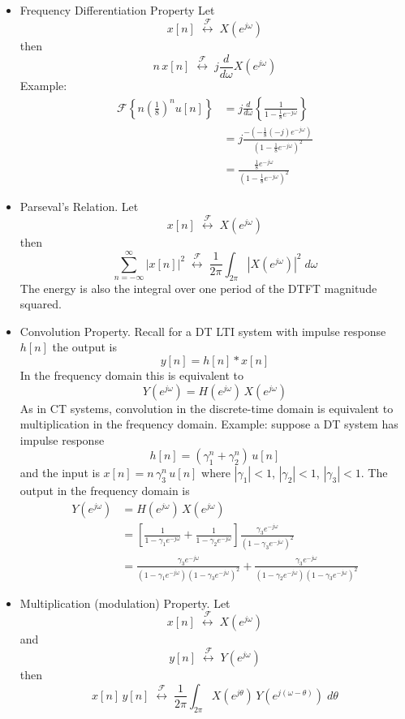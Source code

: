 \begin{itemize}
\begin{center}
\end{center}
\item Frequency Differentiation Property
  Let
  \[
  x[n] \; \stackrel{\mathcal{F}}{\longleftrightarrow} \; X\left(e^{j\omega}\right)
  \]
  then
  \[
  n\, x[n] \; \stackrel{\mathcal{F}}{\longleftrightarrow} \; j \frac{d}{d\omega} X\left(e^{j\omega}\right)
  \]
  Example:
  \begin{align*}
    \mathcal{F}\left\{ n\left( \frac{1}{8}\right)^n u[n] \right\} &= j \frac{d}{d\omega} \left\{\frac{1}{1-\frac{1}{8}e^{-j\omega}} \right\}\\
    &= j \frac{-\left(-\frac{1}{8} (-j)e^{-j\omega}\right)}{\left( 1-\frac{1}{8}e^{-j\omega} \right)^2}\\
    &= \frac{\frac{1}{8}e^{-j\omega}}{\left( 1-\frac{1}{8}e^{-j\omega} \right)^2}
  \end{align*}
\item Parseval's Relation.
  Let
  \[
  x[n] \; \stackrel{\mathcal{F}}{\longleftrightarrow} \; X\left(e^{j\omega}\right)
  \]
  then
  \[
  \sum\limits_{n = -\infty}^{\infty} |x[n]|^2 \; \stackrel{\mathcal{F}}{\longleftrightarrow} \;
  \frac{1}{2\pi} \int_{2\pi} \left| X\left(e^{j\omega}\right) \right|^2 \; d\omega
  \]
  The energy is also the integral over one period of the DTFT magnitude squared. 
\item Convolution Property.
  Recall for a DT LTI system with impulse response $h[n]$ the output is
  \[
  y[n] = h[n]*x[n]
  \]
  In the frequency domain this is equivalent to
  \[
  Y\left(e^{j\omega}\right) = H\left(e^{j\omega}\right) \, X\left(e^{j\omega}\right)
  \]
  As in CT systems, convolution in the discrete-time domain is equivalent to multiplication in the frequency domain. Example: suppose a DT system has impulse response
  \[
  h[n] = \left( \gamma_1^n + \gamma_2^n \right)\, u[n]
  \]
  and the input is $x[n] = n\, \gamma_3^n\, u[n]$ where $|\gamma_1| < 1$, $|\gamma_2| < 1$, $|\gamma_3| < 1$. The output in the frequency domain is
  \begin{align*}
    Y\left(e^{j\omega}\right) &= H\left(e^{j\omega}\right) \, X\left(e^{j\omega}\right)\\
    &= \left[ \frac{1}{1-\gamma_1 e^{-j\omega}} + \frac{1}{1-\gamma_2 e^{-j\omega}} \right] \frac{\gamma_3 e^{-j\omega}}{\left( 1-\gamma_3 e^{-j\omega} \right)^2}\\
    &= \frac{\gamma_3 e^{-j\omega}}{\left(1-\gamma_1 e^{-j\omega}\right)\left( 1-\gamma_3 e^{-j\omega} \right)^2} + \frac{\gamma_3 e^{-j\omega}}{\left(1-\gamma_2 e^{-j\omega}\right)\left( 1-\gamma_3 e^{-j\omega} \right)^2} 
  \end{align*}

\item Multiplication (modulation) Property.
  Let
  \[
  x[n] \; \stackrel{\mathcal{F}}{\longleftrightarrow} \; X\left(e^{j\omega}\right)
  \]
  and
  \[
  y[n] \; \stackrel{\mathcal{F}}{\longleftrightarrow} \; Y\left(e^{j\omega}\right)
  \]
  then
  \[
  x[n]\,y[n] \; \stackrel{\mathcal{F}}{\longleftrightarrow} \; \frac{1}{2\pi} \int_{2\pi} X\left(e^{j\theta}\right)\, Y\left(e^{j(\omega-\theta)}\right)\; d\theta
  \]
\end{itemize}

